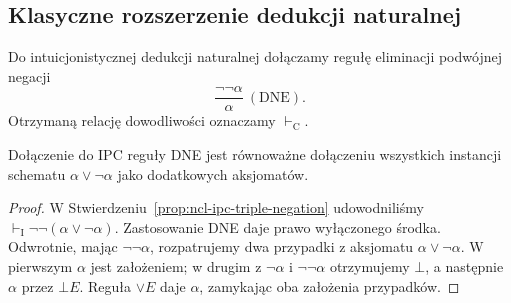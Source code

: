 \subsection{Klasyczne rozszerzenie dedukcji naturalnej}

Do intuicjonistycznej dedukcji naturalnej dołączamy
regułę eliminacji podwójnej negacji
\[
 \frac{\neg\neg\alpha}{\alpha}\ (\mathrm{DNE}).
\]
Otrzymaną relację dowodliwości oznaczamy
$\vdash_{\mathrm C}$.

\begin{stwierdzenie}
\label{prop:ncl-ipc-dne-lem-equivalence}
Dołączenie do IPC reguły DNE jest równoważne
dołączeniu wszystkich instancji schematu
$\alpha\vee\neg\alpha$ jako dodatkowych aksjomatów.
\end{stwierdzenie}
\begin{proof}
W Stwierdzeniu~\ref{prop:ncl-ipc-triple-negation}
udowodniliśmy $\vdash_{\mathrm I}
\neg\neg(\alpha\vee\neg\alpha)$.
Zastosowanie DNE daje prawo wyłączonego środka.
Odwrotnie, mając $\neg\neg\alpha$, rozpatrujemy
dwa przypadki z aksjomatu $\alpha\vee\neg\alpha$.
W pierwszym $\alpha$ jest założeniem;
w drugim z $\neg\alpha$ i $\neg\neg\alpha$
otrzymujemy $\bot$, a następnie $\alpha$
przez $\bot E$. Reguła $\vee E$ daje $\alpha$,
zamykając oba założenia przypadków.
\end{proof}

